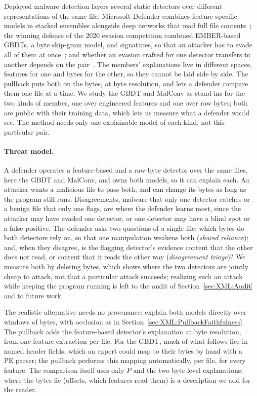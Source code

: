 Deployed malware detection layers several static detectors over different representations of the same file. Microsoft
Defender combines feature-specific models in stacked ensembles alongside deep networks that read full file
contents~\cite{microsoft2019insideout}; the winning defense of the 2020 evasion competition combined EMBER-based GBDTs, a
byte skip-gram model, and signatures, so that an attacker has to evade all of them at once~\cite{quiring2020against};
and whether an evasion crafted for one detector transfers to another depends on the pair~\cite{salman2024robustness}.
The members' explanations live in different spaces, features for one and bytes for the other, so they cannot be laid
side by side. The pullback puts both on the bytes, at byte resolution, and lets a defender compare them one file at a
time. We study the GBDT and MalConv as stand-ins for the two kinds of member, one over engineered features and one over
raw bytes; both are public with their training data, which lets us measure what a defender would see. The method needs
only one explainable model of each kind, not this particular pair.

\paragraph{Threat model.} A defender operates a feature-based and a raw-byte detector over the same files, here the
GBDT and MalConv, and owns both models, so it can explain each. An attacker wants a malicious file to pass both, and can
change its bytes as long as the program still runs. Disagreements, malware that only one detector catches or a benign
file that only one flags, are where the defender learns most, since the attacker may have evaded one detector, or one
detector may have a blind spot or a false positive. The defender asks two questions of a single file: which bytes do
both detectors rely on, so that one manipulation weakens both (\emph{shared reliance}); and, when they disagree, is the
flagging detector's evidence content that the other does not read, or content that it reads the other way
(\emph{disagreement triage})? We measure both by deleting bytes, which shows where the two detectors are jointly cheap
to attack, not that a particular attack succeeds; realizing such an attack while keeping the program running is left to
the audit of Section~\ref{sec:XML:Audit} and to future work.

The realistic alternative needs no provenance: explain both models directly over windows of bytes, with occlusion as in
Section~\ref{sec:XML:PullbackFaithfulness}. The pullback adds the feature-based detector's explanation at byte
resolution, from one feature extraction per file. For the GBDT, much of what follows lies in named header fields, which
an expert could map to their bytes by hand with a PE parser; the pullback performs this mapping automatically, per file,
for every feature. The comparison itself uses only $P$ and the two byte-level explanations; where the bytes lie
(offsets, which features read them) is a description we add for the reader.

